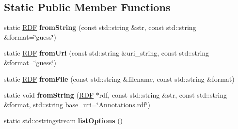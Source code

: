 \subsection*{Static Public Member Functions}
\begin{DoxyCompactItemize}
\item 
\mbox{\label{classomexmeta_1_1RDF_a9d91b3134cdcc6dfef6d62b7b09d8da2}} 
static \hyperlink{classomexmeta_1_1RDF}{R\+DF} {\bfseries from\+String} (const std\+::string \&str, const std\+::string \&format=\char`\"{}guess\char`\"{})
\item 
\mbox{\label{classomexmeta_1_1RDF_a03906aa5c3b9429a2afdbe0ad2be21e6}} 
static \hyperlink{classomexmeta_1_1RDF}{R\+DF} {\bfseries from\+Uri} (const std\+::string \&uri\+\_\+string, const std\+::string \&format=\char`\"{}guess\char`\"{})
\item 
\mbox{\label{classomexmeta_1_1RDF_a98a1da84161a7935bf38ec5e5d34e91f}} 
static \hyperlink{classomexmeta_1_1RDF}{R\+DF} {\bfseries from\+File} (const std\+::string \&filename, const std\+::string \&format)
\item 
\mbox{\label{classomexmeta_1_1RDF_ab2dadc7ff1cf25edbb401b2c879a21b0}} 
static void {\bfseries from\+String} (\hyperlink{classomexmeta_1_1RDF}{R\+DF} $\ast$rdf, const std\+::string \&str, const std\+::string \&format, std\+::string base\+\_\+uri=\char`\"{}Annotations.\+rdf\char`\"{})
\item 
\mbox{\label{classomexmeta_1_1RDF_ae01ed260e02eda2141ffe1288f78c177}} 
static std\+::ostringstream {\bfseries list\+Options} ()
\end{DoxyCompactItemize}
